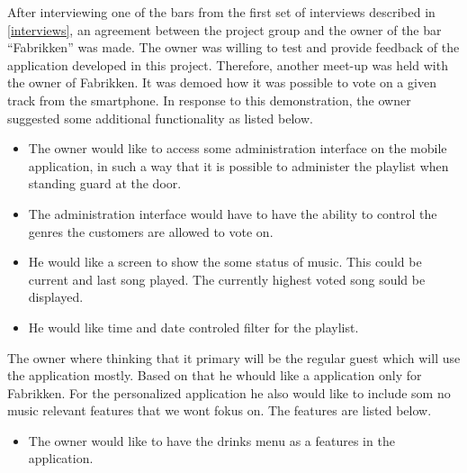 After interviewing one of the bars from the first set of interviews described in \cref{interviews}, an agreement between the project group and the owner of the bar \enquote{Fabrikken} was made. The owner was willing to test and provide feedback of the application developed in this project. Therefore, another meet-up was held with the owner of Fabrikken. It was demoed how it was possible to vote on a given track from the smartphone. In response to this demonstration, the owner suggested some additional functionality as listed below.

\begin{itemize}
	\item{The owner would like to access some administration interface on the mobile application, in such a way that it is possible to administer the playlist when standing guard at the door.}
	\item{The administration interface would have to have the ability to control the genres the customers are allowed to vote on.}
	\item{He would like a screen to show the some status of music. This could be current and last song played. The currently highest voted song sould be displayed.}
	\item{He would like time and date controled filter for the playlist.}
\end{itemize}

The owner where thinking that it primary will be the regular guest which will use the application mostly. Based on that he whould like a application only for Fabrikken. For the personalized application he also would like to include som no music relevant features that we wont fokus on. The features are listed below.

\begin{itemize}
	\item {The owner would like to have the drinks menu as a features in the application.} 
\end{itemize}
